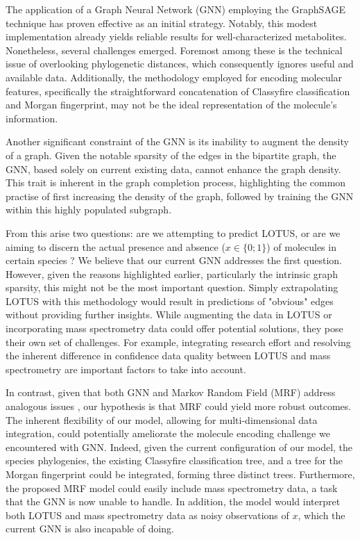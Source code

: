 \documentclass[
11pt, %
oneside, %
english, %
singlespacing, %
headsepline, %
chapterinoneline, %
]{MastersDoctoralThesis} %
\begin{document}
The application of a Graph Neural Network (GNN) employing the GraphSAGE technique has proven effective as an initial strategy. Notably, this modest implementation already yields reliable results for well-characterized metabolites. Nonetheless, several challenges emerged. Foremost among these is the technical issue of overlooking phylogenetic distances, which consequently ignores useful and available data. Additionally, the methodology employed for encoding molecular features, specifically the straightforward concatenation of Classyfire classification and Morgan fingerprint, may not be the ideal representation of the molecule's information.

Another significant constraint of the GNN is its inability to augment the density of a graph. Given the notable sparsity of the edges in the bipartite graph, the GNN, based solely on current existing data, cannot enhance the graph density. This trait is inherent in the graph completion process, highlighting the common practise of first increasing the density of the graph, followed by training the GNN within this highly populated subgraph.

From this arise two questions: are we attempting to predict LOTUS, or are we aiming to discern the actual presence and absence ($x \in \{0;1\}$) of molecules in certain species ? We believe that our current GNN addresses the first question. However, given the reasons highlighted earlier, particularly the intrinsic graph sparsity, this might not be the most important question. Simply extrapolating LOTUS with this methodology would result in predictions of "obvious" edges without providing further insights. While augmenting the data in LOTUS or incorporating mass spectrometry data could offer potential solutions, they pose their own set of challenges. For example, integrating research effort and resolving the inherent difference in confidence data quality between LOTUS and mass spectrometry are important factors to take into account.

In contrast, given that both GNN and Markov Random Field (MRF) address analogous issues \cite{jiaGraphBeliefPropagation2021}, our hypothesis is that MRF could yield more robust outcomes. The inherent flexibility of our model, allowing for multi-dimensional data integration, could potentially ameliorate the molecule encoding challenge we encountered with GNN. Indeed, given the current configuration of our model, the species phylogenies, the existing Classyfire classification tree, and a tree for the Morgan fingerprint could be integrated, forming three distinct trees. Furthermore, the proposed MRF model could easily include mass spectrometry data, a task that the GNN is now unable to handle. In addition, the model would interpret both LOTUS and mass spectrometry data as noisy observations of $x$, which the current GNN is also incapable of doing.
\end{document}
